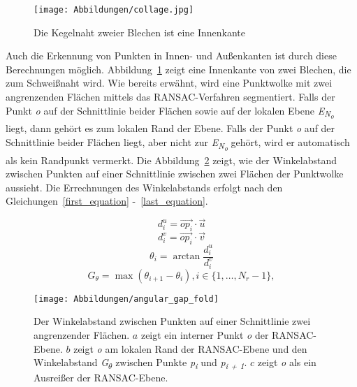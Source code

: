 \begin{figure}[!b]
	\texttt{[image: Abbildungen/collage.jpg]}
	\centering
	\caption[Innenkante zweier Blechen]{Die Kegelnaht zweier Blechen ist eine Innenkante}
	\label{fig: Innenkante}
\end{figure}

Auch die Erkennung von Punkten in Innen- und Außenkanten ist durch diese Berechnungen möglich. Abbildung~\ref{fig: Innenkante} zeigt eine Innenkante von zwei Blechen, die zum Schweißnaht wird. Wie bereits erwähnt, wird eine Punktwolke mit zwei angrenzenden Flächen mittels das RANSAC-Verfahren segmentiert. Falls der Punkt \textit{o} auf der Schnittlinie beider Flächen sowie auf der lokalen Ebene \textit{E\textsubscript{N\textsubscript{o}}} liegt, dann gehört es zum lokalen Rand der Ebene. Falls der Punkt \textit{o} auf der Schnittlinie beider Flächen liegt, aber nicht zur \textit{E\textsubscript{N\textsubscript{o}}} gehört, wird er automatisch als kein Randpunkt vermerkt. Die Abbildung~\ref{edge_fold} zeigt, wie der Winkelabstand zwischen Punkten auf einer Schnittlinie zwischen zwei Flächen der Punktwolke aussieht. Die Errechnungen des Winkelabstands erfolgt nach den Gleichungen~\ref{first_equation} -~\ref{last_equation}.


\begin{equation}
\label{first_equation}
d_i^u = \overrightarrow{{op}_i} \cdot \vec{u}
\end{equation}
\begin{equation}
d_i^v = \overrightarrow{{op}_i} \cdot \vec{v}
\end{equation}
\begin{equation}
\theta_i = \arctan{\frac{d_i^u}{d_i^v}}
\end{equation}
\begin{equation}
G_\theta = \max(\theta_{i + 1} - \theta_i), i \in \{1, \ldots, N_r - 1\},
\label{last_equation}
\end{equation}

\begin{figure}[!b]
	\texttt{[image: Abbildungen/angular\_gap\_fold]}
	\centering
	\caption[Winkelabstand zwischen Punkten zwei angrenzenden Ebenen]{Der Winkelabstand zwischen Punkten auf einer Schnittlinie zwei angrenzender Flächen. \textbf{\(a\)} zeigt ein interner Punkt \textit{o} der RANSAC-Ebene. \textbf{\(b\)} zeigt \textit{o} am lokalen Rand der RANSAC-Ebene und den Winkelabstand \textit{G\textsubscript{$\theta$}} zwischen Punkte \textit{p\textsubscript{i}} und \textit{p\textsubscript{i + 1}}. \textbf{\(c\)} zeigt \textit{o} als ein Ausreißer der RANSAC-Ebene. \autocite{ni_edge_2016}}
	\label{edge_fold}
\end{figure}

